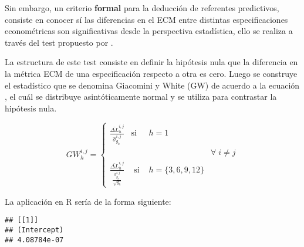 \documentclass[
]{book}
\newenvironment{Shaded}{\begin{snugshade}}{\end{snugshade}}
\newcommand{\AttributeTok}[1]{\textcolor[rgb]{0.77,0.63,0.00}{#1}}
\newcommand{\DecValTok}[1]{\textcolor[rgb]{0.00,0.00,0.81}{#1}}
\newcommand{\FunctionTok}[1]{\textcolor[rgb]{0.00,0.00,0.00}{#1}}
\newcommand{\NormalTok}[1]{#1}
\newcommand{\OtherTok}[1]{\textcolor[rgb]{0.56,0.35,0.01}{#1}}
\newcommand{\SpecialCharTok}[1]{\textcolor[rgb]{0.00,0.00,0.00}{#1}}
\newcommand{\StringTok}[1]{\textcolor[rgb]{0.31,0.60,0.02}{#1}}
\begin{document}
Sin embargo, un criterio \textbf{formal} para la deducción de referentes predictivos, consiste en conocer sí las diferencias en el ECM entre distintas especificaciones econométricas son significativas desde la perspectiva estadística, ello se realiza a través del test propuesto por \citet{Giacomini2006}.

La estructura de este test consiste en definir la hipótesis nula que la diferencia en la métrica ECM de una especificación respecto a otra es cero.
Luego se construye el estadístico que se denomina Giacomini y White (GW) de acuerdo a la ecuación \label{eq:2}, el cuál se distribuye asintóticamente normal y se utiliza para contrastar la hipótesis nula.

\begin{equation} 
GW_{h}^{i,j}= \left\{ \begin{array}{lcll}
 \frac{\bar{\Delta L}^{i,j}_{h}}{\hat{\sigma}^{i,j}_{g_{h}}} & \mbox{si} & h=1 & \\
 & & & \forall\;i\neq j  \\
  \frac{\bar{\Delta L}^{i,j}_{h}}{\frac{\hat{\sigma}^{i,j}_{g_h}}{\sqrt{g_{h}}}} & \mbox{ si } & h = \{3,6,9,12\} & 
 \end{array}
 \right.
 \label{eq:2}
\end{equation}

La aplicación en R sería de la forma siguiente:

\begin{Shaded}
\end{Shaded}

\begin{verbatim}
## [[1]]
## (Intercept) 
## 4.08784e-07
\end{verbatim}

  
\end{document}
